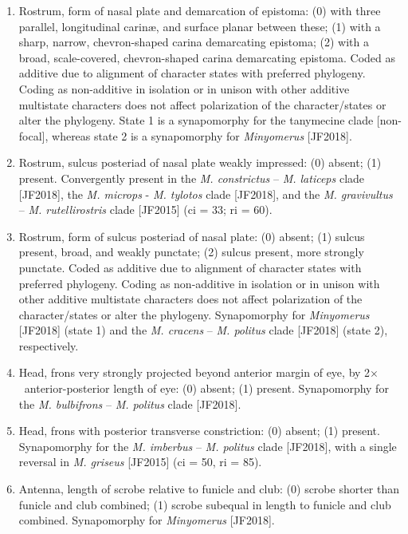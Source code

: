 \documentclass[fleqn,10pt,lineno]{wlpeerj} %
\newcommand{\x}{$\times$~}
\begin{document}
\begin{enumerate}
	 	\item Rostrum, form of nasal plate and demarcation of epistoma: (0) with three parallel, longitudinal carin{\ae}, and surface planar between these; (1) with a sharp, narrow, chevron-shaped carina demarcating epistoma; (2) with a broad, scale-covered, chevron-shaped carina demarcating epistoma. Coded as additive due to alignment of character states with preferred phylogeny. Coding as non-additive in isolation or in unison with other additive multistate characters does not affect polarization of the character/states or alter the phylogeny. State 1 is a synapomorphy for the tanymecine clade [non-focal], whereas state 2 is a synapomorphy for \textit{Minyomerus} [JF2018].
	 	
	 	\item Rostrum, sulcus posteriad of nasal plate weakly impressed: (0) absent; (1) present. Convergently present in the \textit{M. constrictus} – \textit{M. laticeps} clade [JF2018], the \textit{M. microps} - \textit{M. tylotos} clade [JF2018], and the \textit{M. gravivultus} – \textit{M. rutellirostris} clade [JF2015] (ci = 33; ri = 60).
	 	
	 	\item Rostrum, form of sulcus posteriad of nasal plate: (0) absent; (1) sulcus present, broad, and weakly punctate; (2) sulcus present, more strongly punctate. Coded as additive due to alignment of character states with preferred phylogeny. Coding as non-additive in isolation or in unison with other additive multistate characters does not affect polarization of the character/states or alter the phylogeny. Synapomorphy for \textit{Minyomerus} [JF2018] (state 1) and the \textit{M. cracens} – \textit{M. politus} clade [JF2018] (state 2), respectively.
	 	
	 	\item Head, frons very strongly projected beyond anterior margin of eye, by 2\x anterior-posterior length of eye: (0) absent; (1) present. Synapomorphy for the \textit{M. bulbifrons} – \textit{M. politus} clade [JF2018].
	 	
	 	\item Head, frons with posterior transverse constriction: (0) absent; (1) present. Synapomorphy for the \textit{M. imberbus} – \textit{M. politus} clade [JF2018], with a single reversal in \textit{M. griseus} [JF2015] (ci = 50, ri = 85).
	 	
	 	\item Antenna, length of scrobe relative to funicle and club: (0) scrobe shorter than funicle and club combined; (1) scrobe subequal in length to funicle and club combined. Synapomorphy for \textit{Minyomerus} [JF2018].
	 	

\end{enumerate}
\end{document}

